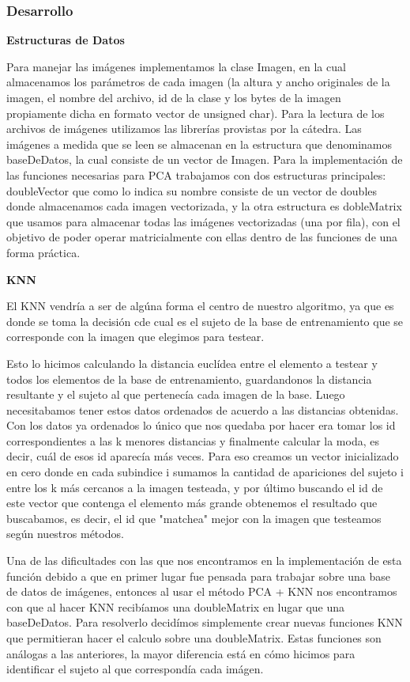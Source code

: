 \subsubsection*{Desarrollo}
\textbf{Estructuras de Datos}

Para manejar las imágenes implementamos la clase Imagen, en la cual almacenamos los parámetros de cada imagen (la altura y ancho originales de la imagen, el nombre del archivo, id de la clase y los bytes de la imagen propiamente dicha en formato vector de unsigned char).
Para la lectura de los archivos de imágenes utilizamos las librerías provistas por la cátedra.
Las imágenes a medida que se leen se almacenan en la estructura que denominamos baseDeDatos, la cual consiste de un vector de Imagen.
Para la implementación de las funciones necesarias para PCA trabajamos con dos estructuras principales: doubleVector que como lo indica su nombre consiste de un vector de doubles donde almacenamos cada imagen vectorizada, y la otra estructura es dobleMatrix que usamos para almacenar todas las imágenes vectorizadas (una por fila), con el objetivo de poder operar matricialmente con ellas dentro de las funciones de una forma práctica.

\textbf{KNN}

El KNN vendría a ser de algúna forma el centro de nuestro algoritmo, ya que es donde se toma la decisión cde cual es el sujeto de la base de entrenamiento que se corresponde con la imagen que elegimos para testear.

Esto lo hicimos calculando la distancia euclídea entre el elemento a testear y todos los elementos de la base de entrenamiento, guardandonos la distancia resultante y el sujeto al que pertenecía cada imagen de la base. Luego necesitabamos tener estos datos ordenados de acuerdo a las distancias obtenidas. Con los datos ya ordenados lo único que nos quedaba por hacer era tomar los id correspondientes a las k menores distancias y finalmente calcular la moda, es decir, cuál de esos id aparecía más veces. Para eso creamos un vector inicializado en cero donde en cada subindice i sumamos la cantidad de apariciones del sujeto i entre los k más cercanos a la imagen testeada, y por último buscando el id de este vector que contenga el elemento más grande obtenemos el resultado que buscabamos, es decir, el id que "matchea" mejor con la imagen que testeamos según nuestros métodos. 

Una de las dificultades con las que nos encontramos en la implementación de esta función debido a que en primer lugar fue pensada para trabajar sobre una base de datos de imágenes, entonces al usar el método PCA + KNN nos encontramos con que al hacer KNN recibíamos una doubleMatrix en lugar que una baseDeDatos.
Para resolverlo decidímos simplemente crear nuevas funciones KNN que permitieran hacer el calculo sobre una doubleMatrix. Estas funciones son análogas a las anteriores, la mayor diferencia está en cómo hicimos para identificar el sujeto al que correspondía cada imágen.

